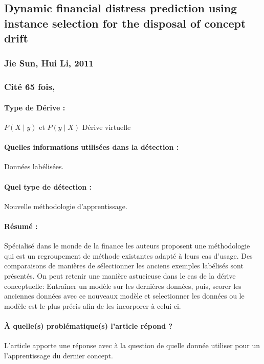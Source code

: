 \documentclass[11pt,a4paper]{report}
\begin{document}
\subsection{Dynamic financial distress prediction using instance selection for the disposal of concept drift}
\subsubsection{Jie Sun, Hui Li, 2011}

\subsubsection{Cité 65 fois, }

\paragraph{Type de Dérive :} $P(X\mid y)$ et $P(y \mid X)$ Dérive virtuelle
\paragraph{Quelles informations utilisées dans la détection :} Données labélisées.
\paragraph{Quel type de détection :} Nouvelle méthodologie d'apprentissage.

\paragraph{Résumé :} Spécialisé dans le monde de la finance les auteurs proposent une méthodologie qui est un regroupement de méthode existantes adapté à leurs cas d'usage. Des comparaisons de manières de sélectionner les anciens exemples labélisés sont présentés. On peut retenir une manière astucieuse dans le cas de la dérive conceptuelle: Entraîner un modèle sur les dernières données, puis, scorer les anciennes données avec ce nouveaux modèle et selectionner les données ou le modèle est le plus précis afin de les incorporer à celui-ci.

\paragraph{À quelle(s) problématique(s) l'article répond ?} L'article apporte une réponse avec à la question de quelle donnée utiliser pour un l'apprentissage du dernier concept.
\end{document}
